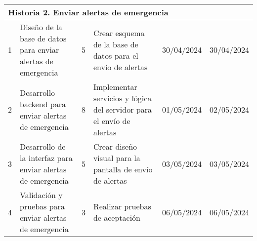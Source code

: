 \begin{longtable}{|p{0.5cm}|p{2cm}|p{1cm}|p{3cm}|p{1cm}|p{1cm}|}
    \multicolumn{6}{|l|}{\textbf{Historia 2. Enviar alertas de emergencia}}                                                                                                                                                                                                                                                                                                                                                            \\ \hline
    1                                        & Diseño de la base de datos para enviar alertas de emergencia                      & 5                                                              & Crear esquema de la base de datos para el envío de alertas                                   & 30/04/2024                                                    & 30/04/2024                                                          \\ \hline
    2                                        & Desarrollo backend para enviar alertas de emergencia                              & 8                                                              & Implementar servicios y lógica del servidor para el envío de alertas                         & 01/05/2024                                                    & 02/05/2024                                                          \\ \hline
    3                                        & Desarrollo de la interfaz para enviar alertas de emergencia                       & 5                                                              & Crear diseño visual para la pantalla de envío de alertas                                     & 03/05/2024                                                    & 03/05/2024                                                          \\ \hline
    4                                        & Validación y pruebas para enviar alertas de emergencia                            & 3                                                              & Realizar pruebas de aceptación                                                               & 06/05/2024                                                    & 06/05/2024                                                          \\ \hline


\end{longtable}
